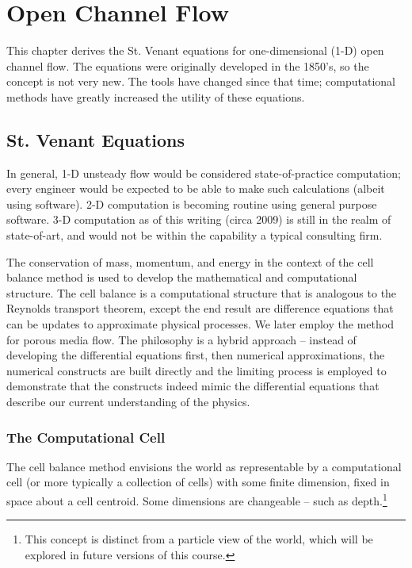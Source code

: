 \section{Open Channel Flow}
This chapter derives the St. Venant equations for one-dimensional (1-D) open channel flow.   
The equations were originally developed in the 1850's, so the concept is not very new.  
The tools have changed since that time; computational methods have greatly increased the utility of these equations.
\subsection{St. Venant Equations}
In general, 1-D unsteady flow would be considered state-of-practice computation; every engineer would be expected to be able to make such calculations (albeit using software).  
2-D computation is becoming routine using general purpose software.  
3-D computation as of this writing (circa 2009) is still in the realm of state-of-art, and would not be within the  capability a typical consulting firm.

The conservation of mass, momentum, and energy in the context of the cell balance method is used to develop the mathematical and computational structure.  
The cell balance is a computational structure that is analogous to the Reynolds transport theorem, except the end result are difference equations that can be updates to approximate physical processes.  
We later employ the method for porous media flow.
The philosophy is a hybrid approach -- instead of developing the  differential equations first, then numerical approximations, the numerical constructs are built directly and the limiting process is employed to demonstrate that the constructs indeed mimic the differential equations that describe our current understanding of the physics.  

\subsubsection{The Computational Cell}
The cell balance method envisions the world as representable by a computational cell (or more typically a collection of cells) with some finite dimension, fixed in space about a cell centroid.  Some dimensions are changeable -- such as depth.\footnote{This concept is distinct from a particle view of the world, which will be explored in future versions of this course.}  

